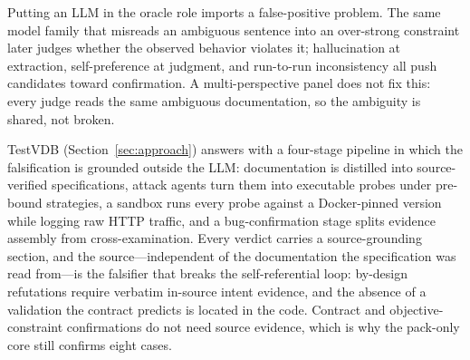 \documentclass[acmsmall,screen,review,anonymous]{acmart}
\newcommand{\system}{TestVDB}
\begin{document}
Putting an LLM in the oracle role imports a false-positive problem. The same model family that misreads an ambiguous sentence into an over-strong constraint later judges whether the observed behavior violates it; hallucination at extraction, self-preference at judgment, and run-to-run inconsistency all push candidates toward confirmation. A multi-perspective panel does not fix this: every judge reads the same ambiguous documentation, so the ambiguity is shared, not broken.

\system{} (Section~\ref{sec:approach}) answers with a four-stage pipeline in which the falsification is grounded outside the LLM: documentation is distilled into source-verified specifications, attack agents turn them into executable probes under pre-bound strategies, a sandbox runs every probe against a Docker-pinned version while logging raw HTTP traffic, and a bug-confirmation stage splits evidence assembly from cross-examination. Every verdict carries a source-grounding section, and the source---independent of the documentation the specification was read from---is the falsifier that breaks the self-referential loop: by-design refutations require verbatim in-source intent evidence, and the absence of a validation the contract predicts is located in the code. Contract and objective-constraint confirmations do not need source evidence, which is why the pack-only core still confirms eight cases.
\end{document}
